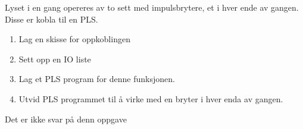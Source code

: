 

Lyset i en gang opereres av to sett med impulsbrytere, et i hver ende
av gangen. Disse er kobla til en PLS.
\begin{enumerate}
\item Lag en skisse for oppkoblingen
\item Sett opp en IO liste
\item Lag et PLS program for denne funksjonen.
\item Utvid PLS programmet til å virke med en bryter i hver enda av gangen. 
\end{enumerate}






Det er ikke svar på denn oppgave












